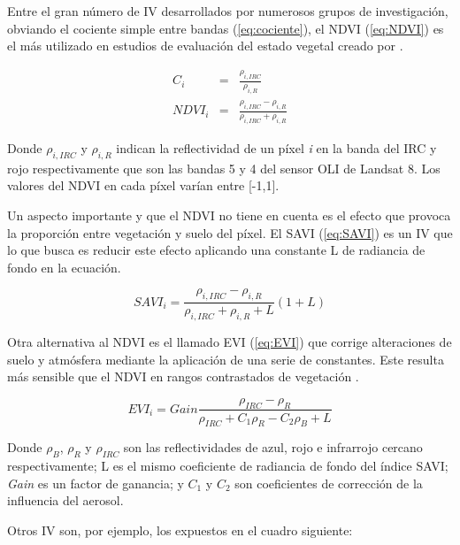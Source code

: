 Entre el gran número de \ac{IV} desarrollados por numerosos grupos de investigación, obviando el cociente simple entre bandas (\ref{eq:cociente}), el \ac{NDVI} (\ref{eq:NDVI}) es el más utilizado en estudios de evaluación del estado vegetal creado por \cite{rouse1974}.

\begin{eqnarray}\label{eq:cociente}
C_{i} & = & \frac{\rho_{i, IRC}}{\rho_{i, R}}\\
NDVI_{i} & = & \frac{\rho_{i, IRC}-\rho_{i, R}}{\rho_{i, IRC}+\rho_{i, R}}
\label{eq:NDVI}
\end{eqnarray}

Donde $\rho_{i, IRC}$ y $\rho_{i, R}$ indican la reflectividad de un píxel \textit{i} en la banda del IRC y rojo respectivamente que son las bandas 5 y 4 del sensor \ac{OLI} de Landsat 8. Los valores del \ac{NDVI} en cada píxel varían entre [-1,1].\Sep

Un aspecto importante y que el \ac{NDVI} no tiene en cuenta es el efecto que provoca la proporción entre vegetación y suelo del píxel. El \ac{SAVI} (\ref{eq:SAVI}) es un \ac{IV} que lo que busca es reducir este efecto aplicando una constante L de radiancia de fondo en la ecuación.

\begin{equation}
SAVI_{i}=\frac{\rho_{i, IRC}-\rho_{i, R}}{\rho_{i, IRC}+\rho_{i, R}+L}(1+L)
\label{eq:SAVI}
\end{equation}\Sep

Otra alternativa al \ac{NDVI} es el llamado \ac{EVI} (\ref{eq:EVI}) que corrige alteraciones de suelo y atmósfera mediante la aplicación de una serie de constantes. Este resulta más sensible que el \ac{NDVI} en rangos contrastados de vegetación \citep{chuvieco2002teledeteccion}.

\begin{equation}
EVI_{i}=Gain\frac{\rho_{IRC}-\rho_{R}}{\rho_{IRC}+C_{1}\rho_{R}-C_{2}\rho_{B}+L}
\label{eq:EVI}
\end{equation}

Donde $\rho_{B}$, $\rho_{R}$ y $\rho_{IRC}$ son las reflectividades de azul, rojo e infrarrojo cercano respectivamente; L es el mismo coeficiente de radiancia de fondo del índice \ac{SAVI}; \textit{Gain} es un factor de ganancia; y $C_{1}$ y $C_{2}$ son coeficientes de corrección de la influencia del aerosol.\Sep

Otros \ac{IV} son, por ejemplo, los expuestos en el cuadro siguiente:

